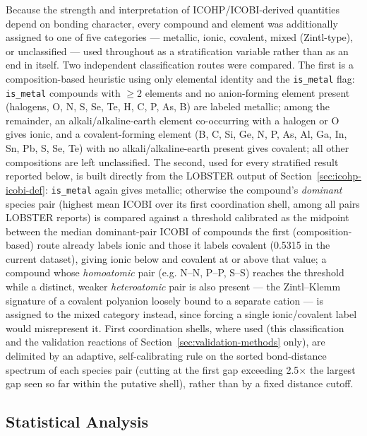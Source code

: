 \documentclass[journal=jpccck,manuscript=article]{achemso}
\begin{document}
Because the strength and interpretation of ICOHP/ICOBI-derived quantities
depend on bonding character, every compound and element was additionally
assigned to one of five categories --- metallic, ionic, covalent, mixed
(Zintl-type), or unclassified --- used throughout as a stratification
variable rather than as an end in itself. Two independent classification
routes were compared. The first is a composition-based heuristic using
only elemental identity and the \texttt{is\_metal} flag: \texttt{is\_metal}
compounds with $\geq2$ elements and no anion-forming element present
(halogens, O, N, S, Se, Te, H, C, P, As, B) are labeled metallic; among
the remainder, an alkali/alkaline-earth element co-occurring with a
halogen or O gives ionic, and a covalent-forming element (B, C, Si, Ge,
N, P, As, Al, Ga, In, Sn, Pb, S, Se, Te) with no alkali/alkaline-earth
present gives covalent; all other compositions are left unclassified.
The second, used for every stratified result reported below, is built
directly from the LOBSTER output of Section~\ref{sec:icohp-icobi-def}:
\texttt{is\_metal} again gives metallic; otherwise the compound's
\emph{dominant} species pair (highest mean ICOBI over its first
coordination shell, among all pairs LOBSTER reports) is compared against
a threshold calibrated as the midpoint between the median dominant-pair
ICOBI of compounds the first (composition-based) route already labels
ionic and those it labels covalent (0.5315 in the current dataset),
giving ionic below and covalent at or above that value; a compound whose
\emph{homoatomic} pair (e.g. N--N, P--P, S--S) reaches the threshold
while a distinct, weaker \emph{heteroatomic} pair is also present ---
the Zintl--Klemm signature of a covalent polyanion loosely bound to a
separate cation --- is assigned to the mixed category instead, since
forcing a single ionic/covalent label would misrepresent it. First
coordination shells, where used (this classification and the validation
reactions of Section~\ref{sec:validation-methods} only), are delimited
by an adaptive, self-calibrating rule on the sorted bond-distance
spectrum of each species pair (cutting at the first gap exceeding
2.5$\times$ the largest gap seen so far within the putative shell),
rather than by a fixed distance cutoff.

\subsection{Statistical Analysis}
\label{sec:stats}
\end{document}
